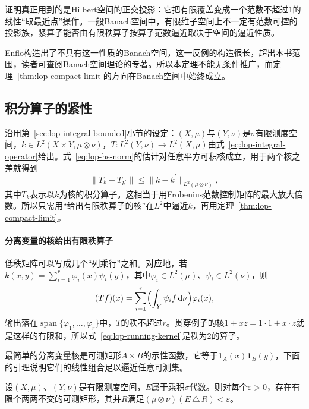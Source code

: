 证明真正用到的是Hilbert空间的正交投影：它把有限覆盖变成一个范数不超过$1$的线性“取最近点”操作。一般Banach空间中，有限维子空间上不一定有范数可控的投影族，紧算子能否由有限秩算子按算子范数逼近取决于空间的逼近性质。

Enflo构造出了不具有这一性质的Banach空间，这一反例的构造很长，超出本书范围，读者可查阅Banach空间理论的专著。所以本定理不能无条件推广，而定理~\ref{thm:lop-compact-limit}的方向在Banach空间中始终成立。

\subsection{积分算子的紧性}
\label{sec:lop-integral-compact}

沿用第~\ref{sec:lop-integral-bounded}小节的设定：$(X,\mu)$与$(Y,\nu)$是$\sigma$有限测度空间，$k\in L^2(X\times Y,\mu\otimes\nu)$，$T:L^2(Y,\nu)\to L^2(X,\mu)$由式~\eqref{eq:lop-integral-operator}给出。式~\eqref{eq:lop-hs-norm}的估计对任意平方可积核成立，用于两个核之差就得到
\begin{equation}
 \lVert T_k-T_{k^\prime}\rVert\leq\lVert k-k^\prime\rVert_{L^2(\mu\otimes\nu)},
 \label{eq:lop-kernel-error}
\end{equation}
其中$T_k$表示以$k$为核的积分算子。这相当于用Frobenius范数控制矩阵的最大放大倍数。所以只需用“给出有限秩算子的核”在$L^2$中逼近$k$，再用定理~\ref{thm:lop-compact-limit}。

\paragraph{分离变量的核给出有限秩算子}
低秩矩阵可以写成几个“列乘行”之和。对应地，若$k(x,y)=\sum_{i=1}^r\varphi_i(x)\psi_i(y)$，其中$\varphi_i\in L^2(\mu)$、$\psi_i\in L^2(\nu)$，则
\[
 (Tf)(x)=\sum_{i=1}^r\Bigl(\int_Y\psi_i f\,\mathrm d\nu\Bigr)\varphi_i(x),
\]
输出落在$\operatorname{span}\{\varphi_1,\ldots,\varphi_r\}$中，$T$的秩不超过$r$。贯穿例子的核$1+xz=1\cdot1+x\cdot z$就是这样的有限和，所以式~\eqref{eq:lop-running-kernel}是秩为$2$的算子。

最简单的分离变量核是可测矩形$A\times B$的示性函数，它等于$\mathbf 1_A(x)\mathbf 1_B(y)$，下面的引理说明它们的线性组合足以逼近任意可测集。

\begin{lemma}[矩形逼近]
\label{lem:lop-rectangle-approx}
设$(X,\mu)$、$(Y,\nu)$是有限测度空间，$E$属于乘积$\sigma$代数。则对每个$\varepsilon>0$，存在有限个两两不交的可测矩形，其并$R$满足$(\mu\otimes\nu)(E\,\triangle\,R)<\varepsilon$。
\end{lemma}

